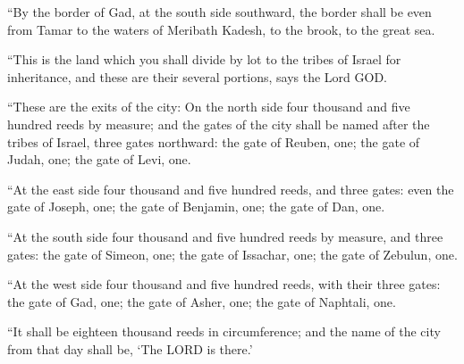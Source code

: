  ``By the border of Gad, at the south side southward, the
border shall be even from Tamar to the waters of Meribath Kadesh, to the
brook, to the great sea.

 ``This is the land which you shall divide by lot to the
tribes of Israel for inheritance, and these are their several portions,
says the Lord GOD.

 ``These are the exits of the city: On the north side four
thousand and five hundred reeds by measure;  and the gates
of the city shall be named after the tribes of Israel, three gates
northward: the gate of Reuben, one; the gate of Judah, one; the gate of
Levi, one.

 ``At the east side four thousand and five hundred reeds,
and three gates: even the gate of Joseph, one; the gate of Benjamin,
one; the gate of Dan, one.

 ``At the south side four thousand and five hundred reeds
by measure, and three gates: the gate of Simeon, one; the gate of
Issachar, one; the gate of Zebulun, one.

 ``At the west side four thousand and five hundred reeds,
with their three gates: the gate of Gad, one; the gate of Asher, one;
the gate of Naphtali, one.

 ``It shall be eighteen thousand reeds in circumference;
and the name of the city from that day shall be, `The LORD is there.'

